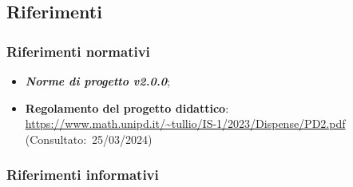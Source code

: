 \subsection{Riferimenti}
\subsubsection{Riferimenti normativi}
\begin{itemize}
    \item \textbf{\textit{Norme di progetto v2.0.0}};
    \item \textbf{Regolamento del progetto didattico}: \url{https://www.math.unipd.it/~tullio/IS-1/2023/Dispense/PD2.pdf} (Consultato:~25/03/2024)
\end{itemize}
\subsubsection{Riferimenti informativi}

